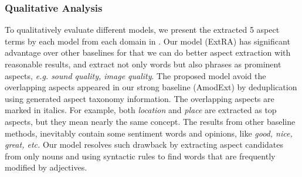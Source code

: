 
\subsubsection{Qualitative Analysis}
To qualitatively evaluate different models,
we present the extracted 5 aspect terms by each model from each domain in . 
Our model (ExtRA) has significant advantage over other baselines for that we can do better aspect extraction with reasonable results, and extract not only words but also phrases as prominent aspects, \textit{e.g. sound quality, image quality}. The proposed model avoid the overlapping aspects appeared in our strong baseline (AmodExt) by deduplication using generated aspect taxonomy information. The overlapping aspects are marked in italics. For example, both \textit{location} and \textit{place} are extracted as top aspects, but they mean nearly the same concept. The results from other baseline methods, inevitably contain some sentiment words and opinions, like \textit{good, nice, great, etc.} Our model resolves such drawback by extracting aspect candidates from only nouns and using syntactic rules to find words that are frequently modified by adjectives.







